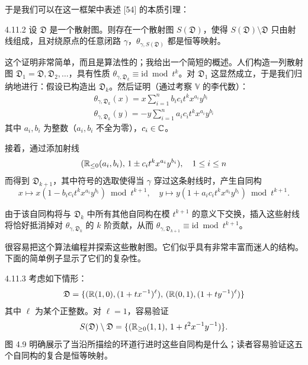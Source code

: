 于是我们可以在这一框架中表述 [54] 的本质引理：

\begin{proposition}{4.11.2}
设 $\mathfrak{D}$ 是一个散射图。则存在一个散射图 $S(\mathfrak{D})$，使得 $S(\mathfrak{D})\setminus\mathfrak{D}$ 只由射线组成，且对绕原点的任意闭路 $\gamma$，$\theta_{\gamma,S(\mathfrak{D})}$ 都是恒等映射。
\end{proposition}

这个证明非常简单，而且是算法性的；我给出一个简短的概述。人们构造一列散射图 $\mathfrak{D}_1=\mathfrak{D},\mathfrak{D}_2,\dots$，具有性质 $\theta_{\gamma,\mathfrak{D}_k}\equiv\mathrm{id}\bmod t^k$。对 $\mathfrak{D}_1$ 这显然成立，于是我们归纳地进行：假设已构造出 $\mathfrak{D}_k$。然后证明（通过考察 $\mathbb{V}$ 的李代数）：
\begin{gather}
\theta_{\gamma,\mathfrak{D}_k}(x)=x\sum_{i=1}^{n}b_ic_it^kx^{a_i}y^{b_i}\\
\theta_{\gamma,\mathfrak{D}_k}(y)=-y\sum_{i=1}^{n}a_ic_it^kx^{a_i}y^{b_i}
\end{gather}
其中 $a_i,b_i$ 为整数（$a_i,b_i$ 不全为零），$c_i\in\mathbb{C}$。

接着，通过添加射线
\[
(\mathbb{R}_{\le0}(a_i,b_i),\,1\pm c_it^kx^{a_i}y^{b_i}),\quad 1\le i\le n
\]
而得到 $\mathfrak{D}_{k+1}$，其中符号的选取使得当 $\gamma$ 穿过这条射线时，产生自同构
\[
x\mapsto x(1-b_ic_it^kx^{a_i}y^{b_i})\bmod t^{k+1},\quad y\mapsto y(1+a_ic_it^kx^{a_i}y^{b_i})\bmod t^{k+1}.
\]

由于该自同构将与 $\mathfrak{D}_k$ 中所有其他自同构在模 $t^{k+1}$ 的意义下交换，插入这些射线将恰好抵消掉对 $\theta_{\gamma,\mathfrak{D}_k}$ 的 $k$ 阶贡献，从而 $\theta_{\gamma,\mathfrak{D}_{k+1}}\equiv\mathrm{id}\bmod t^{k+1}$。

很容易把这个算法编程并探索这些散射图。它们似乎具有非常丰富而迷人的结构。下面的简单例子显示了它们的复杂性。

\begin{example}{4.11.3}
考虑如下情形：
\[
\mathfrak{D}=\{(\mathbb{R}(1,0),(1+tx^{-1})^\ell),\,(\mathbb{R}(0,1),(1+ty^{-1})^\ell)\}
\]
其中 $\ell$ 为某个正整数。对 $\ell=1$，容易验证
\[
S(\mathfrak{D})\setminus\mathfrak{D}=\{(\mathbb{R}_{\ge0}(1,1),\,1+t^2x^{-1}y^{-1})\}.
\]
图 4.9 明确展示了当沿所描绘的环道行进时这些自同构是什么；读者容易验证这五个自同构的复合是恒等映射。
\end{example}
